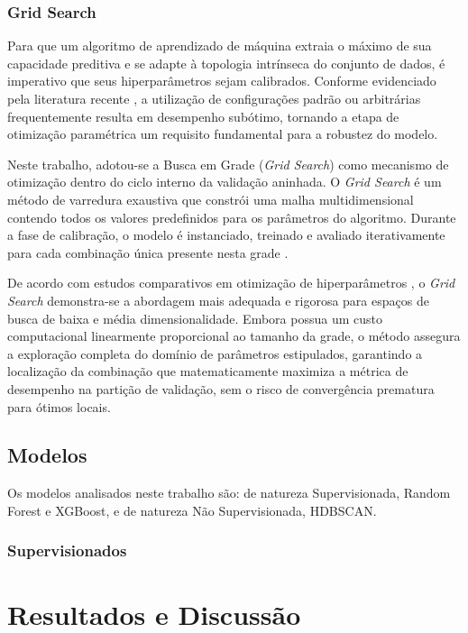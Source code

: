 \documentclass{uflamon}          %
\begin{document}
\subsection{Grid Search}

Para que um algoritmo de aprendizado de máquina extraia o máximo de sua capacidade preditiva e se adapte à topologia intrínseca do conjunto de dados, é imperativo que seus hiperparâmetros sejam calibrados. Conforme evidenciado pela literatura recente \cite{shams2024}, a utilização de configurações padrão ou arbitrárias frequentemente resulta em desempenho subótimo, tornando a etapa de otimização paramétrica um requisito fundamental para a robustez do modelo.

Neste trabalho, adotou-se a Busca em Grade (\textit{Grid Search}) como mecanismo de otimização dentro do ciclo interno da validação aninhada. O \textit{Grid Search} é um método de varredura exaustiva que constrói uma malha multidimensional contendo todos os valores predefinidos para os parâmetros do algoritmo. Durante a fase de calibração, o modelo é instanciado, treinado e avaliado iterativamente para cada combinação única presente nesta grade \cite{shams2024}. 

De acordo com estudos comparativos em otimização de hiperparâmetros \cite{liashchynskyi2019}, o \textit{Grid Search} demonstra-se a abordagem mais adequada e rigorosa para espaços de busca de baixa e média dimensionalidade. Embora possua um custo computacional linearmente proporcional ao tamanho da grade, o método assegura a exploração completa do domínio de parâmetros estipulados, garantindo a localização da combinação que matematicamente maximiza a métrica de desempenho na partição de validação, sem o risco de convergência prematura para ótimos locais.

\section{Modelos}

Os modelos analisados neste trabalho são: de natureza Supervisionada, Random Forest e XGBoost, e de natureza Não Supervisionada, HDBSCAN.

\subsection{Supervisionados}

\chapter{Resultados e Discussão}
\end{document}
